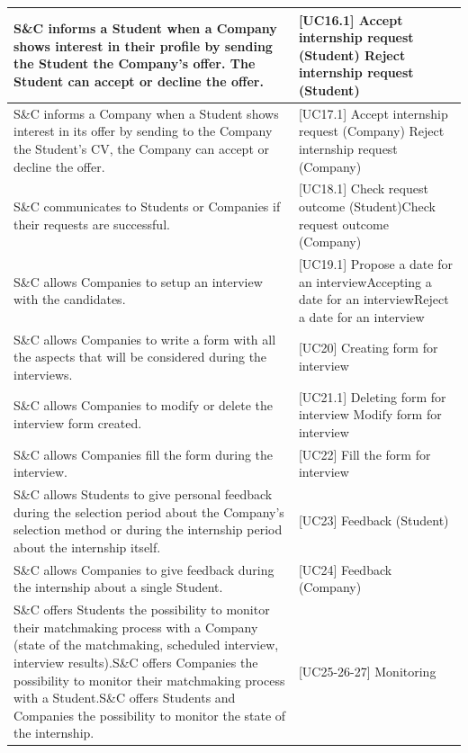 \begin{table}[H]
    \centering
    \begin{tabular}{|p{10cm}|p{5cm}|}
    \hline
         [R16]  S\&C informs a Student when a Company shows interest in their profile by sending the Student the Company's offer. The Student can accept or decline the offer. & [UC16.1] Accept internship request (Student) \newline [UC16.2] Reject internship request (Student)\\\hline
         [R17] S\&C informs a Company when a Student shows interest in its offer by sending to the Company the Student's CV, the Company can accept or decline the offer. & [UC17.1] Accept internship request (Company) \newline [UC17.2] Reject internship request (Company) \\\hline
         [R18] S\&C communicates to Students or Companies if their requests are successful. &[UC18.1] Check request outcome (Student)\newline [UC18.2] Check request outcome (Company)\\\hline
         [R19] S\&C allows Companies to setup an interview with the candidates. & [UC19.1] Propose a date for an interview\newline [UC19.2] Accepting a date for an interview\newline[UC19.3] Reject a date for an interview \\\hline
         [R20] S\&C allows Companies to write a form with all the aspects that will be considered during the interviews.& [UC20] Creating form for interview\\\hline
         [R21] S\&C allows Companies to modify or delete the interview form created. & [UC21.1] Deleting form for interview \newline [UC21.2] Modify form for interview\\\hline
         [R22] S\&C allows Companies fill the form during the interview. & [UC22] Fill the form for interview\\\hline
         [R23] S\&C allows Students to give personal feedback during the selection period about the Company's selection method or during the internship period about the internship itself. & [UC23] Feedback (Student)\\\hline
         [R24] S\&C allows Companies to give feedback during the internship about a single Student. & [UC24] Feedback (Company)\\\hline
         [R25] S\&C offers Students the possibility to monitor their matchmaking process with a Company (state of the matchmaking, scheduled interview, interview results).\newline [R26] S\&C offers Companies the possibility to monitor their matchmaking process with a Student.\newline S\&C offers Students and Companies the possibility to monitor the state of the internship. & [UC25-26-27] Monitoring\\\hline
    \end{tabular}
\end{table}
